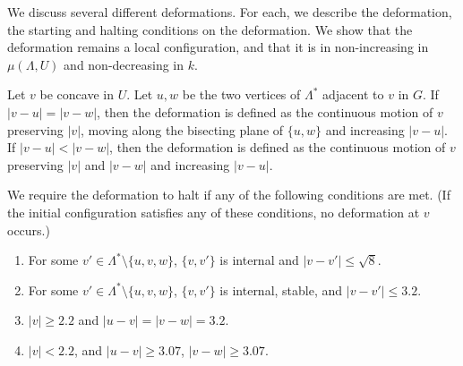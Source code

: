 
We discuss several different  deformations.  For each,
we describe the deformation, the starting and halting conditions on 
the deformation.  We show that the deformation remains a local configuration, and that it is in non-increasing in $\mu(\Lambda,U)$
and non-decreasing in $k$.



Let $v$ be concave in $U$.  Let $u,w$ be the two vertices of
$\Lambda^*$ adjacent to $v$ in $G$. 
If $|v-u|=|v-w|$, then the deformation is defined as the continuous motion
of $v$ preserving $|v|$,  moving along the bisecting plane of $\{u,w\}$
and increasing $|v-u|$.  If $|v-u|<|v-w|$, then the deformation
is defined as the continuous motion of $v$ preserving $|v|$ and
$|v-w|$ and increasing $|v-u|$.

We require the deformation to halt if any of the following conditions
are met.  (If the initial configuration satisfies any of these conditions,
no deformation at $v$ occurs.)
\begin{enumerate}\label{e:halt}
\item For some $v'\in\Lambda^*\setminus\{u,v,w\}$, 
$\{v,v'\}$ is internal and $|v-v'|\le \sqrt8$.
\item For some $v'\in\Lambda^*\setminus\{u,v,w\}$,
$\{v,v'\}$ is internal, stable, and $|v-v'|\le 3.2$.
\item $|v|\ge 2.2$ and $|u-v|=|v-w|=3.2$.  
\item $|v|< 2.2$, 
and $|u-v|\ge 3.07$, $|v-w|\ge 3.07$.
\end{enumerate}

